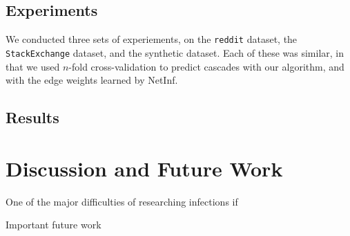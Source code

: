 \documentclass{article} %
\begin{document}
\subsection{Experiments}
\label{experiments}

We conducted three sets of experiements, on the \texttt{reddit} dataset, the \texttt{StackExchange} dataset, and the synthetic dataset. Each of these was similar, in that we used $n$-fold cross-validation to predict cascades with our algorithm, and with the edge weights learned by NetInf.

\subsection{Results}
\label{results}



\section{Discussion and Future Work}
\label{discussion}

One of the major difficulties of researching infections if 

Important future work 

{}
\label{refs}

\end{document}
